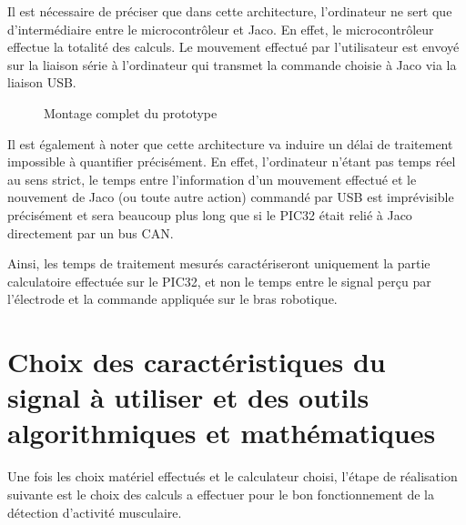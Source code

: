 \documentclass[letterpaper, twoside, 12pt, memoire, creativecommons, hyperref]{thETS}
\begin{document}
Il est nécessaire de préciser que dans cette architecture, l'ordinateur ne sert que d'intermédiaire entre le microcontrôleur et Jaco. En effet, le microcontrôleur effectue la totalité des calculs. Le mouvement effectué par l'utilisateur est envoyé sur la liaison série à l'ordinateur qui transmet la commande choisie à Jaco via la liaison USB. 

\begin{figure}
	\centering
	\caption{Montage complet du prototype}
	\label{fig:archiMatMont}
\end{figure}

Il est également à noter que cette architecture va induire un délai de traitement impossible à quantifier précisément. En effet, l'ordinateur n'étant pas temps réel au sens strict, le temps entre l'information d'un mouvement effectué et le nouvement de Jaco (ou toute autre action) commandé par USB est imprévisible précisément et sera beaucoup plus long que si le PIC32 était relié à Jaco directement par un bus CAN. 

Ainsi, les temps de traitement mesurés caractériseront uniquement la partie calculatoire effectuée sur le PIC32, et non le temps entre le signal perçu par l'électrode et la commande appliquée sur le bras robotique.

\section{Choix des caractéristiques du signal à utiliser et des outils algorithmiques et mathématiques}

Une fois les choix matériel effectués et le calculateur choisi, l'étape de réalisation suivante est le choix des calculs a effectuer pour le bon fonctionnement de la détection d'activité musculaire. 
\end{document}
